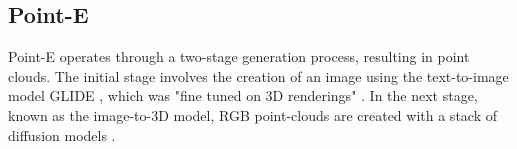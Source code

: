 \subsection{Point-E}
\label{point-e}

Point-E operates through a two-stage generation process, resulting in point clouds. The initial stage involves the creation of an image using the text-to-image model GLIDE \citep{nicholGLIDE}, which was "fine tuned on 3D renderings" \citep{nicholPointE}. In the next stage, known as the image-to-3D model, RGB point-clouds are created with a stack of diffusion models \citep{nicholPointE}.
